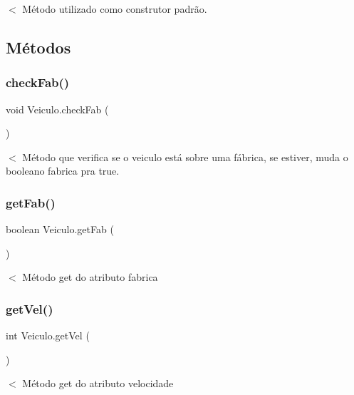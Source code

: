 $<$ Método utilizado como construtor padrão. 

\subsection{Métodos}
\mbox{\label{class_veiculo_af565d4a9368f62efe67608dbcf18ef2d}} 
\subsubsection{\texorpdfstring{check\+Fab()}{checkFab()}}
{\footnotesize\ttfamily void Veiculo.\+check\+Fab (\begin{DoxyParamCaption}{ }\end{DoxyParamCaption})}

$<$ Método que verifica se o veiculo está sobre uma fábrica, se estiver, muda o booleano fabrica pra true. \mbox{\label{class_veiculo_a7509d7e1ba79a662b145f8907c4e97c1}} 
\subsubsection{\texorpdfstring{get\+Fab()}{getFab()}}
{\footnotesize\ttfamily boolean Veiculo.\+get\+Fab (\begin{DoxyParamCaption}{ }\end{DoxyParamCaption})}

$<$ Método get do atributo fabrica \mbox{\label{class_veiculo_ab43d327b067e15c1bc96cee94d495049}} 
\subsubsection{\texorpdfstring{get\+Vel()}{getVel()}}
{\footnotesize\ttfamily int Veiculo.\+get\+Vel (\begin{DoxyParamCaption}{ }\end{DoxyParamCaption})}

$<$ Método get do atributo velocidade \mbox{\label{class_veiculo_a235b29e1e25ec8c769b20fb2aeba8404}} 
